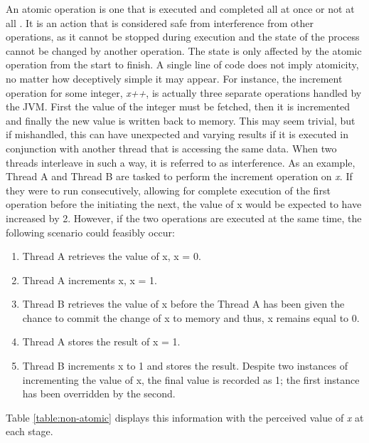 \documentclass[a4paper,12pt]{article}
\begin{document}
An atomic operation is one that is executed and completed all at once or not at all \citep{concurrency19}. It is an action that is considered safe from interference from other operations, as it cannot be stopped during execution and the state of the process cannot be changed by another operation. The state is only affected by the atomic operation from the start to finish. A single line of code does not imply atomicity, no matter how deceptively simple it may appear. For instance, the increment operation for some integer, \textit{x++}, is actually three separate operations handled by the JVM. First the value of the integer must be fetched, then it is incremented and finally the new value is written back to memory. This may seem trivial, but if mishandled, this can have unexpected and varying results if it is executed in conjunction with another thread that is accessing the same data. When two threads interleave in such a way, it is referred to as interference. As an example, Thread A and Thread B are tasked to perform the increment operation on \textit{x}. If they were to run consecutively, allowing for complete execution of the first operation before the initiating the next, the value of x would be expected to have increased by 2. However, if the two operations are executed at the same time, the following scenario could feasibly occur:
\begin{enumerate}
    \item Thread A retrieves the value of x, x = 0.
    \item Thread A increments x, x = 1.
    \item Thread B retrieves the value of x before the Thread A has been given the chance to commit the change of x to memory and thus, x remains equal to 0.
    \item Thread A stores the result of x = 1.
    \item Thread B increments x to 1 and stores the result. Despite two instances of incrementing the value of x, the final value is recorded as 1; the first instance has been overridden by the second.
\end{enumerate}

Table \ref{table:non-atomic} displays this information with the perceived value of \textit{x} at each stage.
\end{document}
